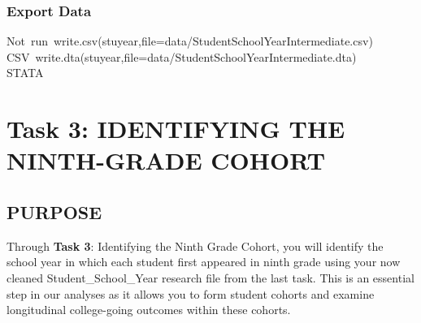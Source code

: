 \documentclass[12pt]{article}
\makeatletter
\newcommand{\hlcomment}[1]{\textcolor[rgb]{0.180392156862745,0.6,0.341176470588235}{#1}}%
\newcommand{\hlstd}[1]{\textcolor[rgb]{0,0,0}{#1}}%
\newenvironment{kframe}{%
 \def\FrameCommand##1{\hskip\@totalleftmargin \hskip-\fboxsep
 \colorbox{shadecolor}{##1}\hskip-\fboxsep
     \hskip-\linewidth \hskip-\@totalleftmargin \hskip\columnwidth}%
 \MakeFramed {\advance\hsize-\width
   \@totalleftmargin\z@ \linewidth\hsize
   \@setminipage}}%
 {\par\unskip\endMakeFramed}
\newenvironment{knitrout}{}{} %
\renewenvironment{knitrout}{\begin{footnotesize}}{\end{footnotesize}}
\makeatother
\begin{document}
\subsubsection{Export Data}

\begin{knitrout}
\color{fgcolor}\begin{kframe}
\begin{flushleft}
\ttfamily\noindent
\hlcomment{\usebox{\hlnormalsizeboxhash}{\ }Not{\ }run{\ }write.csv(stuyear,file=\usebox{\hlnormalsizeboxsinglequote}data/Student\usebox{\hlnormalsizeboxunderscore}School\usebox{\hlnormalsizeboxunderscore}Year\usebox{\hlnormalsizeboxunderscore}Intermediate.csv\usebox{\hlnormalsizeboxsinglequote}){\ }\usebox{\hlnormalsizeboxhash}}\hspace*{\fill}\\
\hlstd{}\hlcomment{\usebox{\hlnormalsizeboxhash}{\ }CSV{\ }write.dta(stuyear,file=\usebox{\hlnormalsizeboxsinglequote}data/Student\usebox{\hlnormalsizeboxunderscore}School\usebox{\hlnormalsizeboxunderscore}Year\usebox{\hlnormalsizeboxunderscore}Intermediate.dta\usebox{\hlnormalsizeboxsinglequote}){\ }\usebox{\hlnormalsizeboxhash}}\hspace*{\fill}\\
\hlstd{}\hlcomment{\usebox{\hlnormalsizeboxhash}{\ }STATA}\mbox{}
\normalfont
\end{flushleft}
\end{kframe}
\end{knitrout}



\section{Task 3: IDENTIFYING THE NINTH-GRADE COHORT}
\label{sec:task3}
\subsection{PURPOSE}
Through \textbf{Task 3}: Identifying the Ninth Grade Cohort, you will identify the school year in which each student first appeared in ninth 
grade using your now cleaned Student_School_Year research file from the last task. This is an essential step in our analyses as it 
allows you to form student cohorts and examine longitudinal college-going outcomes within these cohorts.\\
\end{document}
